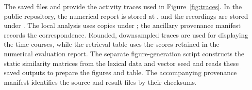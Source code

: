The saved files  and  provide the activity traces used in Figure~\ref{fig:traces}. In the public repository, the numerical report is stored at , and the recordings are stored under . The local analysis uses copies under ; the ancillary provenance manifest records the correspondence. Rounded, downsampled traces are used for displaying the time courses, while the retrieval table uses the scores retained in the numerical evaluation report. The separate figure-generation script constructs the static similarity matrices from the lexical data and vector seed and reads these saved outputs to prepare the figures and table. The accompanying provenance manifest identifies the source and result files by their checksums.
